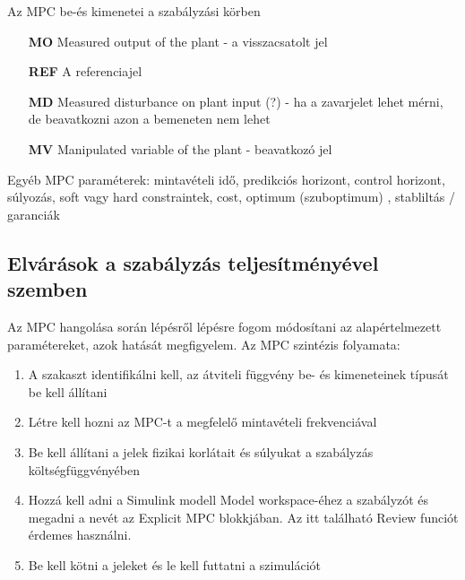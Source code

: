 \vspace{12pt}


\begin{table*}[h]
	\caption{Az MPC be-és kimenetei a szabályzási körben}
	\label{nomencl_mpcsignals}
	\begin{itemize}[noitemsep,topsep=0pt,parsep=2pt,partopsep=4pt,leftmargin=42pt]
		\item[\textbf{MO}] Measured output of the plant - a visszacsatolt jel
		\item[\textbf{REF}] A referenciajel %
		\item[\textbf{MD}] Measured disturbance on plant input (?) - ha a zavarjelet lehet mérni, de beavatkozni azon a bemeneten nem lehet
		\item[\textbf{MV}] Manipulated variable of the plant - beavatkozó jel 
	\end{itemize}
\end{table*}
Egyéb MPC paraméterek: mintavételi idő, predikciós horizont, control horizont, súlyozás, soft vagy hard constraintek, cost, optimum (szuboptimum) , stabliltás / garanciák






\subsection{Elvárások a szabályzás teljesítményével szemben}

Az MPC hangolása során %
lépésről lépésre fogom módosítani az alapértelmezett paramétereket, azok hatását megfigyelem.
Az MPC szintézis folyamata:%


\begin{enumerate}[noitemsep,topsep=0pt,parsep=2pt,partopsep=4pt,leftmargin=30pt]
	\item A szakaszt identifikálni kell, az átviteli függvény be- és kimeneteinek típusát be kell állítani
	\item Létre kell hozni az MPC-t a megfelelő mintavételi frekvenciával
	\item Be kell állítani a jelek fizikai korlátait és súlyukat a szabályzás költségfüggvényében
	\item Hozzá kell adni a Simulink modell Model workspace-éhez a szabályzót és megadni a nevét az Explicit MPC blokkjában. Az itt található Review funciót érdemes használni.
	\item Be kell kötni a jeleket és le kell futtatni a szimulációt
	
\end{enumerate}

